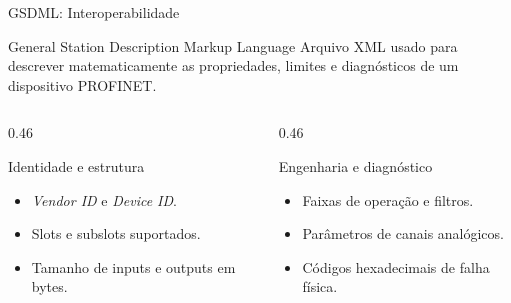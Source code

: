 \documentclass[10pt, aspectratio=169]{beamer}
\begin{document}
\begin{frame}{GSDML: Interoperabilidade}
    \small
    \begin{block}{General Station Description Markup Language}
        Arquivo XML usado para descrever matematicamente as propriedades, limites e diagn\'osticos de um dispositivo PROFINET.
    \end{block}

    \begin{columns}[T,totalwidth=\textwidth]
        \begin{column}{0.46\textwidth}
            \begin{block}{Identidade e estrutura}
                \begin{itemize}
                    \item \textit{Vendor ID} e \textit{Device ID}.
                    \item Slots e subslots suportados.
                    \item Tamanho de inputs e outputs em bytes.
                \end{itemize}
            \end{block}
        \end{column}
        \begin{column}{0.46\textwidth}
            \begin{block}{Engenharia e diagn\'ostico}
                \begin{itemize}
                    \item Faixas de opera\c{c}\~ao e filtros.
                    \item Par\^ametros de canais anal\'ogicos.
                    \item C\'odigos hexadecimais de falha f\'isica.
                \end{itemize}
            \end{block}
        \end{column}
    \end{columns}
\end{frame}
\end{document}
